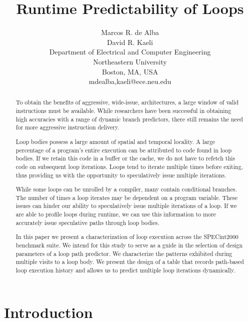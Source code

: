 \documentclass[times,10pt,twocolumn]{article}
\begin{document}
\title{{\Large Runtime Predictability of Loops}}
\author{Marcos R. de Alba \\
        David R. Kaeli \\
	Department of Electrical and Computer Engineering \\
	Northeastern University \\
	Boston, MA, USA \\
	{mdealba,kaeli}@ece.neu.edu}
\maketitle
\thispagestyle{empty}

\begin{abstract}

To obtain the benefits of aggressive, wide-issue, architectures, 
a large window of valid instructions must be available.  
While researchers
have been successful in obtaining high accuracies with a range
of dynamic branch predictors, there still remains the need for more
aggressive instruction delivery.

Loop bodies possess a large amount of spatial and temporal locality.  A large
percentage of a program's entire execution can be attributed to code found
in loop bodies.  
If we retain this code in a buffer or the cache, we do not have to
refetch this code on subsequent loop iterations. 
Loops tend to iterate multiple times before exiting, thus providing
us with the opportunity to speculatively issue multiple iterations.
  
While some loops can be unrolled by a compiler, many
contain conditional branches.
The number of times a loop iterates may be dependent on a program variable.
These issues can hinder our ability to speculatively issue multiple
iterations of a loop. 
If we are able to profile loops during runtime, we can use this information
to more accurately issue speculative paths through loop bodies. 

In this paper we present a characterization of loop execution
across the SPECint2000 benchmark suite. We intend for this study
to serve as a guide in 
the selection of design parameters of a loop path predictor.
We characterize the patterns exhibited during multiple visits to a loop body. 
We present the design of a table that records path-based loop execution history
and allows us to predict multiple loop iterations dynamically.

\end{abstract} 

\section{Introduction}
\end{document}
